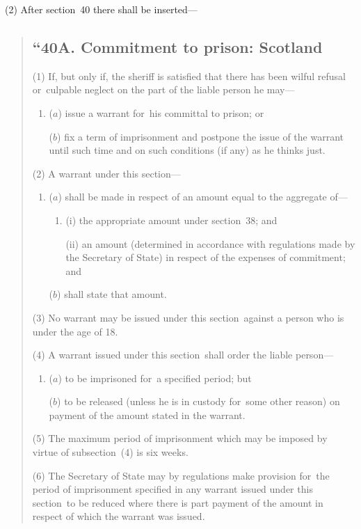\documentclass[12pt,a4paper]{article}
\begin{document}
(2) After section~40 there shall be inserted—
\begin{quotation}
\subsection*{“40A. Commitment to prison: Scotland}

(1) If, but only if, the sheriff is satisfied that there has been wilful refusal or~culpable neglect on the part of the liable person he may—
\begin{enumerate}\item[]
($a$) issue a warrant for~his committal to prison; or

($b$) fix a term of imprisonment and postpone the issue of the warrant until such time and on such conditions (if any) as he thinks just.
\end{enumerate}

(2) A warrant under this section—
\begin{enumerate}\item[]
($a$) shall be made in respect of an amount equal to the aggregate of—
\begin{enumerate}\item[]
(i) the appropriate amount under section~38; and

(ii) an amount (determined in accordance with regulations made by the Secretary of State) in respect of the expenses of commitment; and
\end{enumerate}

($b$) shall state that amount.
\end{enumerate}

(3) No warrant may be issued under this section~against a person who is under the age of 18. 

(4) A warrant issued under this section~shall order the liable person—
\begin{enumerate}\item[]
($a$) to be imprisoned for~a specified period; but

($b$) to be released (unless he is in custody for~some other reason) on payment of the amount stated in the warrant.
\end{enumerate}

(5) The maximum period of imprisonment which may be imposed by virtue of subsection~(4)  is six weeks.

(6) The Secretary of State may by regulations make provision for~the period of imprisonment specified in any warrant issued under this section~to be reduced where there is part payment of the amount in respect of which the warrant was issued.


\end{quotation}
\end{document}

